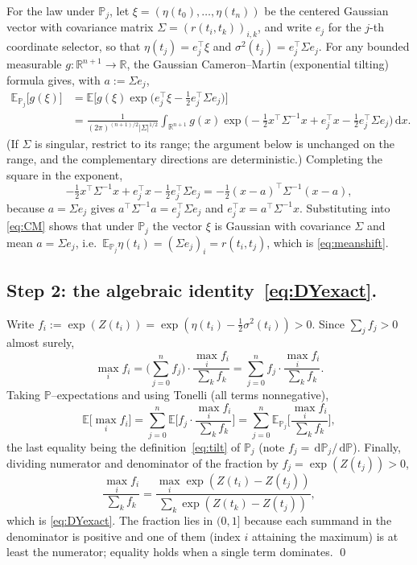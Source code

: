 \documentclass{amsart}
\theoremstyle{definition}
\newcommand{\E}{\mathbb{E}}
\newcommand{\PP}{\mathbb{P}}
\newcommand{\R}{\mathbb{R}}
\newcommand{\dd}{\,\mathrm{d}}
\begin{document}
For the law under $\PP_j$, let $\xi=(\eta(t_0),\dots,\eta(t_n))$ be the centered
Gaussian vector with covariance matrix $\Sigma=(r(t_i,t_k))_{i,k}$, and write
$e_j$ for the $j$-th coordinate selector, so that
$\eta(t_j)=e_j^\top\xi$ and $\sigma^2(t_j)=e_j^\top\Sigma e_j$.
For any bounded measurable $g:\R^{n+1}\to\R$, the Gaussian Cameron--Martin
(exponential tilting) formula gives, with $a:=\Sigma e_j$,
\begin{align}
   \E_{\PP_j}\big[g(\xi)\big]
   &=\E\Big[g(\xi)\exp\!\big(e_j^\top\xi-\tfrac12 e_j^\top\Sigma e_j\big)\Big]
     \nonumber\\
   &=\frac{1}{(2\pi)^{(n+1)/2}|\Sigma|^{1/2}}\int_{\R^{n+1}} g(x)
     \exp\!\Big(-\tfrac12 x^\top\Sigma^{-1}x+e_j^\top x-\tfrac12 e_j^\top\Sigma e_j\Big)\dd x.
   \label{eq:CM}
\end{align}
(If $\Sigma$ is singular, restrict to its range; the argument below is unchanged
on the range, and the complementary directions are deterministic.)
Completing the square in the exponent,
\[
  -\tfrac12 x^\top\Sigma^{-1}x+e_j^\top x-\tfrac12 e_j^\top\Sigma e_j
  =-\tfrac12 (x-a)^\top\Sigma^{-1}(x-a),
\]
because $a=\Sigma e_j$ gives $a^\top\Sigma^{-1}a=e_j^\top\Sigma e_j$ and
$e_j^\top x=a^\top\Sigma^{-1}x$. Substituting into \eqref{eq:CM} shows that under
$\PP_j$ the vector $\xi$ is Gaussian with covariance $\Sigma$ and mean
$a=\Sigma e_j$, i.e.\ $\E_{\PP_j}\eta(t_i)=(\Sigma e_j)_i=r(t_i,t_j)$, which is
\eqref{eq:meanshift}.

\subsection*{Step 2: the algebraic identity~\eqref{eq:DYexact}.}
Write $f_i:=\exp(Z(t_i))=\exp(\eta(t_i)-\tfrac12\sigma^2(t_i))>0$. Since
$\sum_{j}f_j>0$ almost surely,
\[
   \max_i f_i
   =\Big(\sum_{j=0}^{n}f_j\Big)\cdot\frac{\max_i f_i}{\sum_{k}f_k}
   =\sum_{j=0}^{n} f_j\cdot\frac{\max_i f_i}{\sum_{k}f_k}.
\]
Taking $\PP$--expectations and using Tonelli (all terms nonnegative),
\[
   \E\Big[\max_i f_i\Big]
   =\sum_{j=0}^{n}\E\Big[f_j\cdot\frac{\max_i f_i}{\sum_{k}f_k}\Big]
   =\sum_{j=0}^{n}\E_{\PP_j}\Big[\frac{\max_i f_i}{\sum_{k}f_k}\Big],
\]
the last equality being the definition~\eqref{eq:tilt} of $\PP_j$
(note $f_j=\dd\PP_j/\dd\PP$). Finally, dividing numerator and denominator of the
fraction by $f_j=\exp(Z(t_j))>0$,
\[
   \frac{\max_i f_i}{\sum_k f_k}
   =\frac{\max_i \exp(Z(t_i)-Z(t_j))}{\sum_k \exp(Z(t_k)-Z(t_j))},
\]
which is \eqref{eq:DYexact}. The fraction lies in $(0,1]$ because each summand in
the denominator is positive and one of them (index $i$ attaining the maximum) is
at least the numerator; equality holds when a single term dominates. \qed
\end{document}
